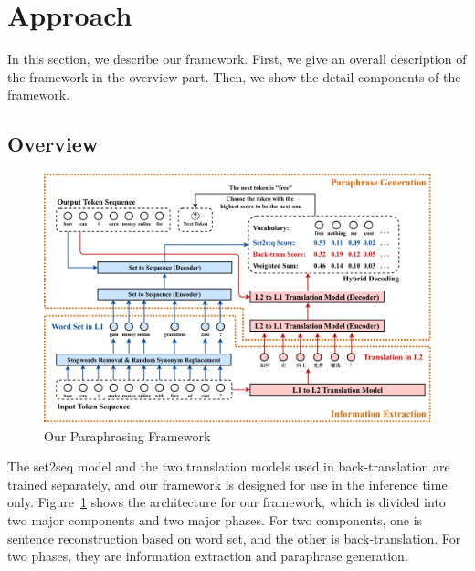 \section{Approach}
In this section, we describe our framework. First, we give an overall description of the framework in the overview part. 
Then, we show the detail components of the framework.

\subsection{Overview} \label{sec:overview}
\begin{figure}[ht]
\centering
\includegraphics[width=1.9\columnwidth]{Paraphrase.pdf}
\caption{Our Paraphrasing Framework}
\label{fig:app}
\end{figure}


The set2seq model and the two translation models used in back-translation 
are trained separately, and our framework is designed for use in
the inference time only. Figure~\ref{fig:app} shows the architecture for 
our framework, which is divided into two major components and two major phases. For two components, one is sentence reconstruction based on word set, 
and the other is back-translation. For two phases, they are 
information extraction and paraphrase generation.

